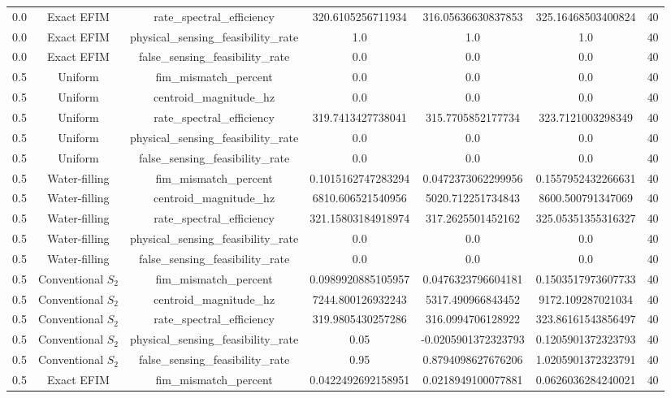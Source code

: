 \begin{table}[t]
\begin{tabular}{lcccccc}
0.0 & Exact EFIM & rate_spectral_efficiency & 320.6105256711934 & 316.05636630837853 & 325.16468503400824 & 40 \\
0.0 & Exact EFIM & physical_sensing_feasibility_rate & 1.0 & 1.0 & 1.0 & 40 \\
0.0 & Exact EFIM & false_sensing_feasibility_rate & 0.0 & 0.0 & 0.0 & 40 \\
0.5 & Uniform & fim_mismatch_percent & 0.0 & 0.0 & 0.0 & 40 \\
0.5 & Uniform & centroid_magnitude_hz & 0.0 & 0.0 & 0.0 & 40 \\
0.5 & Uniform & rate_spectral_efficiency & 319.7413427738041 & 315.7705852177734 & 323.7121003298349 & 40 \\
0.5 & Uniform & physical_sensing_feasibility_rate & 0.0 & 0.0 & 0.0 & 40 \\
0.5 & Uniform & false_sensing_feasibility_rate & 0.0 & 0.0 & 0.0 & 40 \\
0.5 & Water-filling & fim_mismatch_percent & 0.1015162747283294 & 0.0472373062299956 & 0.1557952432266631 & 40 \\
0.5 & Water-filling & centroid_magnitude_hz & 6810.606521540956 & 5020.712251734843 & 8600.500791347069 & 40 \\
0.5 & Water-filling & rate_spectral_efficiency & 321.15803184918974 & 317.2625501452162 & 325.05351355316327 & 40 \\
0.5 & Water-filling & physical_sensing_feasibility_rate & 0.0 & 0.0 & 0.0 & 40 \\
0.5 & Water-filling & false_sensing_feasibility_rate & 0.0 & 0.0 & 0.0 & 40 \\
0.5 & Conventional $S_2$ & fim_mismatch_percent & 0.0989920885105957 & 0.0476323796604181 & 0.1503517973607733 & 40 \\
0.5 & Conventional $S_2$ & centroid_magnitude_hz & 7244.800126932243 & 5317.490966843452 & 9172.109287021034 & 40 \\
0.5 & Conventional $S_2$ & rate_spectral_efficiency & 319.9805430257286 & 316.0994706128922 & 323.86161543856497 & 40 \\
0.5 & Conventional $S_2$ & physical_sensing_feasibility_rate & 0.05 & -0.0205901372323793 & 0.1205901372323793 & 40 \\
0.5 & Conventional $S_2$ & false_sensing_feasibility_rate & 0.95 & 0.8794098627676206 & 1.0205901372323791 & 40 \\
0.5 & Exact EFIM & fim_mismatch_percent & 0.0422492692158951 & 0.0218949100077881 & 0.0626036284240021 & 40 \\

\end{tabular}
\end{table}

